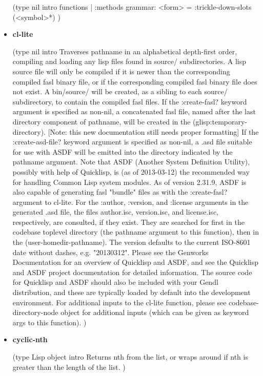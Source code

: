 \documentclass [11pt]{book}
\begin{document}
\begin{itemize}
(type nil intro  functions | :methods grammar: 
<form>  = :trickle-down-slots (<symbol>*)
)



\item {}
\label{prim:cl-lite}
\textbf{cl-lite}

(type nil intro
 Traverses pathname in an alphabetical depth-first order, compiling
and loading any lisp files found in source/ subdirectories. A lisp
source file will only be compiled if it is newer than the
corresponding compiled fasl binary file, or if the corresponding
compiled fasl binary file does not exist. A bin/source/ will be
created, as a sibling to each source/ subdirectory, to contain the
compiled fasl files.
If the :create-fasl? keyword argument is specified as non-nil, a
concatenated fasl file, named after the last directory component of
pathname, will be created in the (glisp:temporary-directory).
[Note: this new documentation still needs proper formatting]
If the :create-asd-file? keyword argument is specified as non-nil,
a .asd file suitable for use with ASDF will be emitted into the
directory indicated by the pathname argument. Note that
 ASDF (Another System Definition Utility), possibly with help of 
Quicklisp, is (as of 2013-03-12) the recommended way for handling
Common Lisp system modules. As of version 2.31.9, ASDF is also
capable of generating fasl "bundle" files as with
the :create-fasl? argument to cl-lite.
For the :author, :version, and :license arguments in the generated
.asd file, the files author.isc, version.isc, and license.isc,
respectively, are consulted, if they exist. They are searched for
first in the codebase toplevel directory (the pathname argument to
this function), then in the (user-homedir-pathname). The version
defaults to the current ISO-8601 date without dashes,
e.g. "20130312".
Please see the Genworks Documentation for an overview of Quicklisp
and ASDF, and see the Quicklisp and ASDF project documentation for
detailed information. The source code for Quicklisp and ASDF should
also be included with your Gendl distribution, and these are
typically loaded by default into the development environment.
For additional inputs to the cl-lite function, please see
codebase-directory-node object for additional inputs (which can be
given as keyword args to this function).
)



\item {}
\label{prim:cyclic-nth}
\textbf{cyclic-nth}

(type Lisp object intro
  Returns nth from the list, or wraps around if nth is greater than the length of the list.
)




\end{itemize}
\end{document}
